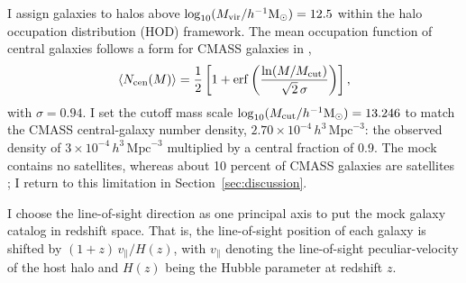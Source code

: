 \documentclass[11pt,letterpaper]{article}
\begin{document}
I assign galaxies to halos above $\log_{10}(M_{\rm vir}/h^{-1}\mathrm{M}_{\odot})=12.5$ within the halo occupation distribution (HOD) framework. 
The mean occupation function of central galaxies follows a form for CMASS galaxies in \citet{White2011},
\begin{equation}
  \langle N_{\rm cen}(M)\rangle = \frac{1}{2}\left[1+\mathrm{erf}
  \left(\frac{\ln(M/M_{\rm cut})}{\sqrt{2}\,\sigma}\right)\right],
  \label{eq:hod}
\end{equation}
with $\sigma=0.94$. I set the cutoff mass scale $\log_{10}(M_{\rm cut}/h^{-1}\mathrm{M}_{\odot})=13.246$ to match the CMASS central-galaxy number density,
$2.70\times10^{-4}\,h^{3}\,\mathrm{Mpc}^{-3}$: the observed density of
$3\times10^{-4}\,h^{3}\,\mathrm{Mpc}^{-3}$ multiplied by a central fraction
of 0.9.
The mock contains no satellites, whereas about 10 percent of
CMASS galaxies are satellites \citep{White2011}; I return to this limitation
in Section~\ref{sec:discussion}. 

I choose the line-of-sight direction as one principal axis to put the mock galaxy catalog in redshift space. That is, the line-of-sight position of each galaxy is shifted by $(1+z)\,v_{\parallel}/H(z)$, with $v_{\parallel}$ denoting the line-of-sight peculiar-velocity of the host halo and $H(z)$ being the Hubble parameter at redshift $z$. 
\end{document}
